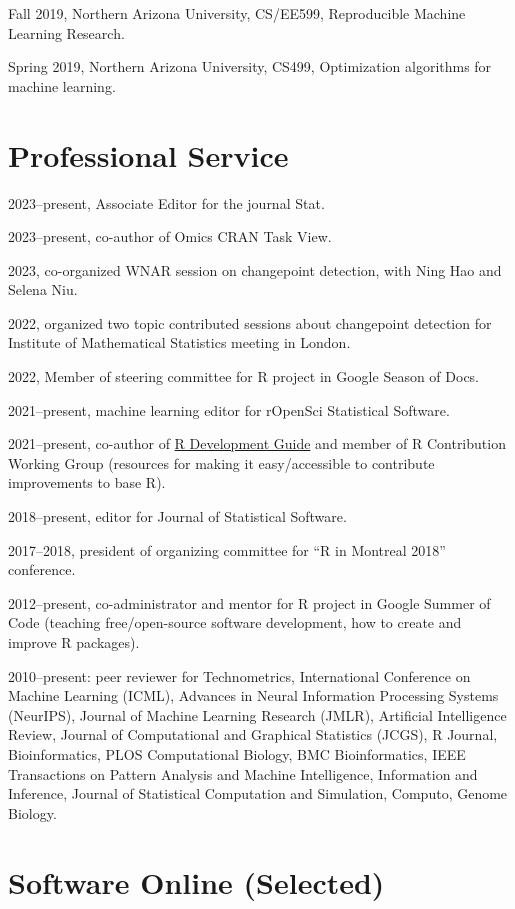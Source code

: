 \documentclass[margin,line]{res}
\begin{document}
\begin{resume}
Fall 2019, Northern Arizona University, CS/EE599, Reproducible Machine
Learning Research.

Spring 2019, Northern Arizona University, CS499, Optimization
algorithms for machine learning.

\section{\sc Professional Service}

2023--present, Associate Editor for the journal Stat.

2023--present, co-author of Omics CRAN Task View.

2023, co-organized WNAR session on changepoint detection, with Ning
Hao and Selena Niu.

2022, organized two topic contributed sessions about changepoint
detection for Institute of Mathematical Statistics meeting in London.

2022, Member of steering committee for R project in Google Season of Docs.

2021--present, machine learning editor for rOpenSci Statistical Software.

2021--present, co-author of
\href{https://contributor.r-project.org/rdevguide/}{R Development
  Guide} and member of R Contribution Working Group (resources for
making it easy/accessible to contribute improvements to base R).

2018--present, editor for Journal of Statistical Software.

2017--2018, president of organizing committee for ``R in Montreal
2018'' conference.

2012--present, co-administrator and mentor for R project in Google
Summer of Code (teaching free/open-source software development, how to
create and improve R packages).

2010--present: peer reviewer for Technometrics, International
Conference on Machine Learning (ICML), Advances in Neural Information
Processing Systems (NeurIPS), Journal of Machine Learning Research
(JMLR), Artificial Intelligence Review, Journal of Computational and
Graphical Statistics (JCGS), R Journal, Bioinformatics, PLOS
Computational Biology, BMC Bioinformatics, IEEE Transactions on
Pattern Analysis and Machine Intelligence, Information and Inference,
Journal of Statistical Computation and Simulation, Computo, Genome
Biology.

\section{\sc Software Online (Selected)} 


\end{resume}
\end{document}
